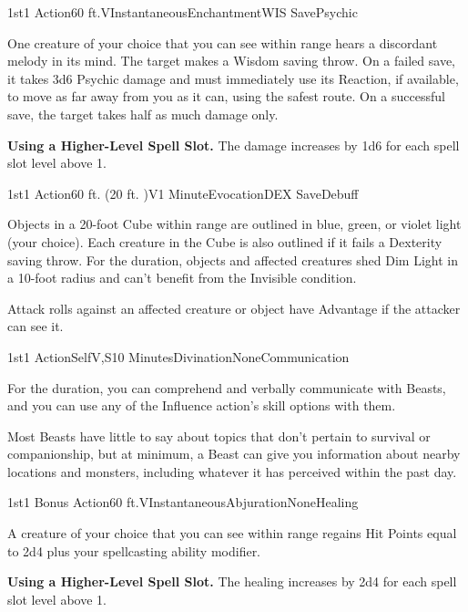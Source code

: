 
\begin{Spell}{1st}{1 Action}{60 ft.}{V}{Instantaneous}{Enchantment}{WIS Save}{Psychic}

One creature of your choice that you can see within range hears a discordant melody in its mind. The target makes a Wisdom saving throw. On a failed save, it takes 3d6 Psychic damage and must immediately use its Reaction, if available, to move as far away from you as it can, using the safest route. On a successful save, the target takes half as much damage only.

\textbf{Using a Higher-Level Spell Slot.} The damage increases by 1d6 for each spell slot level above 1.

\end{Spell}


\begin{Spell}{1st}{1 Action}{60 ft. (20 ft. )}{V}{1 Minute}{Evocation}{DEX Save}{Debuff}

Objects in a 20-foot Cube within range are outlined in blue, green, or violet light (your choice). Each creature in the Cube is also outlined if it fails a Dexterity saving throw. For the duration, objects and affected creatures shed Dim Light in a 10-foot radius and can't benefit from the Invisible condition.

Attack rolls against an affected creature or object have Advantage if the attacker can see it.

\end{Spell}


\begin{Spell}{1st}{1 Action}{Self}{V,S}{10 Minutes}{Divination}{None}{Communication}

For the duration, you can comprehend and verbally communicate with Beasts, and you can use any of the Influence action's skill options with them.

Most Beasts have little to say about topics that don't pertain to survival or companionship, but at minimum, a Beast can give you information about nearby locations and monsters, including whatever it has perceived within the past day.

\end{Spell}

\begin{Spell}{1st}{1 Bonus Action}{60 ft.}{V}{Instantaneous}{Abjuration}{None}{Healing}

A creature of your choice that you can see within range regains Hit Points equal to 2d4 plus your spellcasting ability modifier.

\textbf{Using a Higher-Level Spell Slot.} The healing increases by 2d4 for each spell slot level above 1.
\end{Spell}


